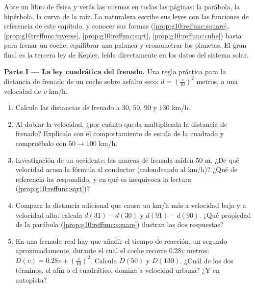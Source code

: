 \begin{problem}
\label{pb:g10:reffunc:1}
Abre un libro de física y verás las mismas  en todas las páginas:
la parábola, la hipérbola, la curva de la raíz. La naturaleza escribe sus
leyes con las funciones de referencia de este capítulo, y conocer sus
formas (\cref{prop:g10:reffunc:square}, \cref{prop:g10:reffunc:inverse},
\cref{prop:g10:reffunc:sqrt}, \cref{prop:g10:reffunc:cube}) basta para
frenar un coche, equilibrar una palanca y cronometrar los planetas. El
gran final es la tercera ley de Kepler, leída directamente en los datos
del sistema solar.

\medskip
\noindent\textbf{Parte I --- La ley cuadrática del frenado.}
Una regla práctica para la distancia de frenado de un coche sobre asfalto
seco: $d = \left(\frac{v}{10}\right)^{2}$ metros, a una velocidad de $v$
km/h.
\begin{enumerate}
  \item Calcula las distancias de frenado a $30$, $50$, $90$ y $130$ km/h.
  \item Al doblar la velocidad, ¿por cuánto queda multiplicada la
        distancia de frenado? Explícalo con el comportamiento de escala de
        la  cuadrado y compruébalo con $50 \to 100$ km/h.
  \item Investigación de un accidente: las marcas de frenada miden $50$ m.
        ¿De qué velocidad acusa la fórmula al conductor (redondeando al
        km/h)? ¿Qué  de referencia ha respondido, y en qué 
        es inequívoca la lectura (\cref{prop:g10:reffunc:sqrt})?
  \item Compara la distancia adicional que causa \emph{un} km/h más a
        velocidad baja y a velocidad alta: calcula $d(31) - d(30)$ y
        $d(91) - d(90)$. ¿Qué propiedad de la parábola
        (\cref{prop:g10:reffunc:square}) ilustran las dos respuestas?
  \item En una frenada real hay que añadir el tiempo de reacción, un
        segundo aproximadamente, durante el cual el coche recorre $0.28v$
        metros: $D(v) = 0.28v + \left(\frac{v}{10}\right)^2$. Calcula
        $D(50)$ y $D(130)$. ¿Cuál de los dos términos, el afín o el
        cuadrático, domina a velocidad urbana? ¿Y en autopista?
\end{enumerate}


\end{problem}
